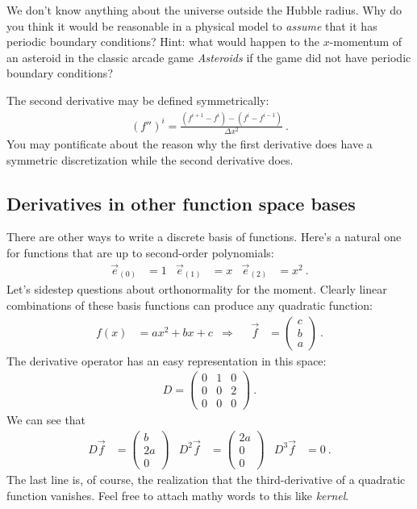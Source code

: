 \begin{exercise}
We don't know anything about the universe outside the Hubble radius. Why do you think it would be reasonable in a physical model to \emph{assume} that it has periodic boundary conditions? Hint: what would happen to the $x$-momentum of an asteroid in the classic arcade game \emph{Asteroids} if the game did not have periodic boundary conditions? 
\end{exercise}

The second derivative may be defined symmetrically:
\begin{align}
  (f'')^i = \frac{(f^{i+1} - f^i) - (f^i - f^{i-1})}{\Delta x^2} \ .
\end{align}
You may pontificate about the reason why the first derivative does have a symmetric discretization while the second derivative does. 


\subsection{Derivatives in other function space bases}
\label{sec:derivatives}

There are other ways to write a discrete basis of functions. Here’s a natural one for functions that are up to second-order polynomials:
\begin{align}
  \vec{e}_{(0)} &= 1
  &
  \vec{e}_{(1)} &= x
  &
  \vec{e}_{(2)} &= x^2 \ .
\end{align}
Let’s sidestep questions about orthonormality for the moment. Clearly linear combinations of these basis functions can produce any quadratic function:
\begin{align}
  f(x) &= a x^2 + bx + c
  & \Rightarrow&&
  \vec{f} &=
  \begin{pmatrix}
     c \\ b \\ a
   \end{pmatrix} \ . 
\end{align}
The derivative operator has an easy representation in this space:
\begin{align}
  D = 
  \begin{pmatrix}
    0 & 1 & 0   \\
    0 & 0 & 2   \\
    0 & 0 & 0   
  \end{pmatrix} \ .
\end{align}
We can see that
\begin{align}
  D \vec{f}  &= 
  \begin{pmatrix}
     b \\
     2 a \\
     0
  \end{pmatrix} 
  &
  D^2 \vec{f}  &= 
  \begin{pmatrix}
     2a \\
     0 \\
     0
  \end{pmatrix} 
  &
  D^3 \vec{f}  &= 
  0 \ .
\end{align}
The last line is, of course, the realization that the third-derivative of a quadratic function vanishes. Feel free to attach mathy words to this like \emph{kernel}.

